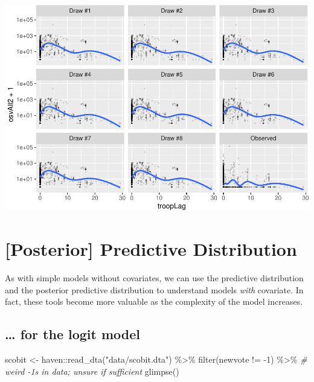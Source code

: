 \documentclass[
]{book}
\newenvironment{Shaded}{\begin{snugshade}}{\end{snugshade}}
\newcommand{\CommentTok}[1]{\textcolor[rgb]{0.56,0.35,0.01}{\textit{#1}}}
\newcommand{\DecValTok}[1]{\textcolor[rgb]{0.00,0.00,0.81}{#1}}
\newcommand{\FunctionTok}[1]{\textcolor[rgb]{0.00,0.00,0.00}{#1}}
\newcommand{\NormalTok}[1]{#1}
\newcommand{\OtherTok}[1]{\textcolor[rgb]{0.56,0.35,0.01}{#1}}
\newcommand{\SpecialCharTok}[1]{\textcolor[rgb]{0.00,0.00,0.00}{#1}}
\newcommand{\StringTok}[1]{\textcolor[rgb]{0.31,0.60,0.02}{#1}}
\begin{document}
\includegraphics{03-03-poisson-model_files/figure-latex/unnamed-chunk-5-1.pdf}

\hypertarget{posterior-predictive-distribution-1}{%
\section{{[}Posterior{]} Predictive
Distribution}\label{posterior-predictive-distribution-1}}

As with simple models without covariates, we can use the predictive
distribution and the posterior predictive distribution to understand
models \emph{with} covariate. In fact, these tools become more valuable
as the complexity of the model increases.

\hypertarget{for-the-logit-model}{%
\subsection{\ldots{} for the logit model}\label{for-the-logit-model}}

\begin{Shaded}
\begin{Highlighting}[]
\NormalTok{scobit }\OtherTok{\textless{}{-}}\NormalTok{ haven}\SpecialCharTok{::}\FunctionTok{read\_dta}\NormalTok{(}\StringTok{"data/scobit.dta"}\NormalTok{) }\SpecialCharTok{\%\textgreater{}\%}
  \FunctionTok{filter}\NormalTok{(newvote }\SpecialCharTok{!=} \SpecialCharTok{{-}}\DecValTok{1}\NormalTok{) }\SpecialCharTok{\%\textgreater{}\%}  \CommentTok{\# weird {-}1s in data; unsure if sufficient}
  \FunctionTok{glimpse}\NormalTok{()}
\end{Highlighting}
\end{Shaded}
\end{document}
